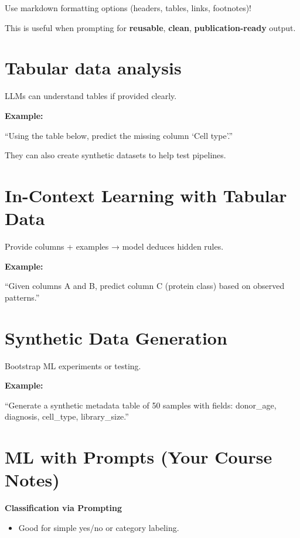 \documentclass[
  letterpaper,
  DIV=11,
  numbers=noendperiod]{scrreprt}
\providecommand{\tightlist}{%
  \setlength{\itemsep}{0pt}\setlength{\parskip}{0pt}}
\begin{document}
Use markdown formatting options (headers, tables, links, footnotes)!

This is useful when prompting for \textbf{reusable}, \textbf{clean},
\textbf{publication-ready} output.

\section{Tabular data analysis}\label{tabular-data-analysis}

LLMs can understand tables if provided clearly.

\textbf{Example:}

``Using the table below, predict the missing column `Cell type'.''

They can also create synthetic datasets to help test pipelines.

\section{In-Context Learning with Tabular
Data}\label{in-context-learning-with-tabular-data}

Provide columns + examples → model deduces hidden rules.

\textbf{Example:}

``Given columns A and B, predict column C (protein class) based on
observed patterns.''

\section{Synthetic Data Generation}\label{synthetic-data-generation}

Bootstrap ML experiments or testing.

\textbf{Example:}

``Generate a synthetic metadata table of 50 samples with fields:
donor\_age, diagnosis, cell\_type, library\_size.''

\section{ML with Prompts (Your Course
Notes)}\label{ml-with-prompts-your-course-notes}

\textbf{Classification via Prompting}

\begin{itemize}
\tightlist
\item
  Good for simple yes/no or category labeling.
\end{itemize}
\end{document}
